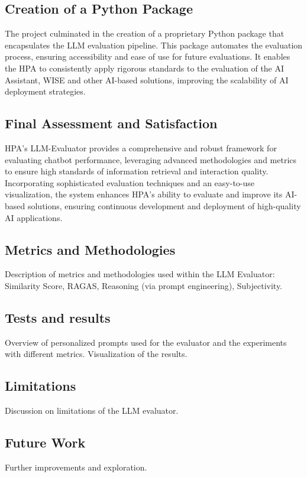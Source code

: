 \subsection{Creation of a Python Package}

The project culminated in the creation of a proprietary Python package that encapsulates the LLM evaluation pipeline. This package automates the evaluation process, ensuring accessibility and ease of use for future evaluations. It enables the HPA to consistently apply rigorous standards to the evaluation of the AI Assistant, WISE and other AI-based solutions, improving the scalability of AI deployment strategies.

\subsection{Final Assessment and Satisfaction}

HPA's LLM-Evaluator provides a comprehensive and robust framework for evaluating chatbot performance, leveraging advanced methodologies and metrics to ensure high standards of information retrieval and interaction quality. Incorporating sophisticated evaluation techniques and an easy-to-use visualization, the system enhances HPA's ability to evaluate and improve its AI-based solutions, ensuring continuous development and deployment of high-quality AI applications.

\subsection{Metrics and Methodologies}
Description of metrics and methodologies used within the LLM Evaluator: Similarity Score, RAGAS, Reasoning (via prompt engineering), Subjectivity.

\subsection{Tests and results}
Overview of personalized prompts used for the evaluator and the experiments with different metrics. Visualization of the results.

\subsection{Limitations}
Discussion on limitations of the LLM evaluator.

\subsection{Future Work}
Further improvements and exploration.
